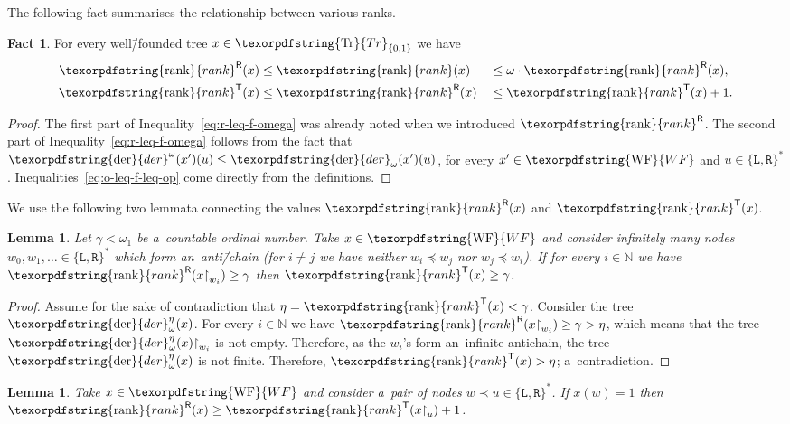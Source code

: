 \documentclass[11pt,a4paper]{amsart}
\theoremstyle{plain}
\newtheorem{lem}[thm]{Lemma}
\theoremstyle{definition}
\newtheorem{fact}[thm]{Fact}
\theoremstyle{defC}
\theoremstyle{thmC}
\theoremstyle{plain}
\numberwithin{equation}{section}
\numberwithin{equation}{section}
\numberwithin{figure}{section}
\newcommand{\ident}[1]{\ensuremath{\texorpdfstring{\mathrm{\mathnm{#1}}}{#1}}\xspace}
\newcommand{\domain}[1]{\ensuremath{\mathbb{#1}}\xspace}
\newcommand{\N}{\domain{N}}
\newcommand{\dL}{\mathtt{{\scriptstyle L}}}
\newcommand{\dR}{\mathtt{{\scriptstyle R}}}
\newcommand{\mathnm}[1]{#1}
\newcommand{\restr}{{\upharpoonright}}
\newcommand{\trees}{\ident{Tr}}
\newcommand{\WF}{\ident{WF}}
\newcommand{\der}{\ident{der}}
\newcommand{\sT}{\mathsf{T}}
\newcommand{\sR}{\mathsf{R}}
\newcommand{\rank}{\ident{rank}}
\newcommand{\rankR}{\ident{rank}^\sR}
\newcommand{\rankT}{\ident{rank}^\sT}
\newcommand{\derF}{\der_\omega}
\begin{document}
The following fact summarises the relationship between various ranks.

\begin{fact}\label{ft:monotone}
	For every well\=/founded tree $x\in\trees_{\{0,1\}}$ we have
	\begin{alignat}{4}
	\rankR(x) &\leq \rank(x) &&\leq\omega\cdot \rankR(x),\label{eq:r-leq-f-omega}\\
	\rankT(x) &\leq \rankR(x) &&\leq\rankT(x)+1.\label{eq:o-leq-f-leq-op}
	\end{alignat}
\end{fact}

\begin{proof}
	The first part of Inequality~\eqref{eq:r-leq-f-omega} was already noted when we introduced $\rankR$.
	The second part of Inequality~\eqref{eq:r-leq-f-omega} follows from the fact that $\der^\omega(x')(u) \leq \derF(x')(u)$, for every $x'\in\WF$ and $u\in\{\dL,\dR\}^\ast$.
	Inequalities~\eqref{eq:o-leq-f-leq-op} come directly from the definitions.
\end{proof}

We use the following two lemmata connecting the values $\rankR(x)$ and $\rankT(x)$.

\begin{lem}\label{lem:inf-fank-to-oank}
	Let $\gamma<\omega_1$ be a~countable ordinal number.
	Take $x\in\WF$ and consider infinitely many nodes $w_0,w_1,\ldots\in\{\dL,\dR\}^\ast$ which form an~anti\=/chain (for $i\neq j$ we have neither $w_i\preceq w_j$ nor $w_j\preceq w_i$).
	If for every $i\in\N$ we have $\rankR(x\restr_{w_i})\geq \gamma$ then $\rankT(x)\geq\gamma$.
\end{lem}

\begin{proof}
	Assume for the sake of contradiction that $\eta=\rankT(x)<\gamma$.
	Consider the tree $\derF^\eta(x)$.
	For every $i\in\N$ we have $\rankR(x\restr_{w_i})\geq\gamma>\eta$, which means that the tree $\derF^\eta(x)\restr_{w_i}$ is not empty.
	Therefore, as the $w_i$'s form an~infinite antichain, the tree $\derF^\eta(x)$ is not finite.
	Therefore, $\rankT(x)>\eta$; a~contradiction.
\end{proof}

\begin{lem}\label{lem:fin-oank-to-fank}
	Take $x\in\WF$ and consider a~pair of nodes $w\prec u\in\{\dL,\dR\}^\ast$.
	If $x(w)=1$ then $\rankR(x)\geq \rankT(x\restr_u)+1$.
\end{lem}
\end{document}
